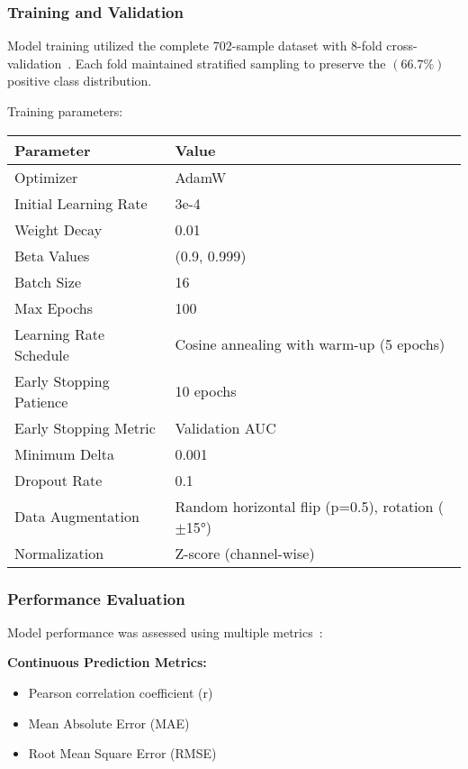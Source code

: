 \subsubsection{Training and Validation}

Model training utilized the complete 702-sample dataset with 8-fold cross-validation~\cite{varoquaux2022machine}. Each fold maintained stratified sampling to preserve the $(66.7\%)$ positive class distribution.

Training parameters:

\begin{center}
\small
\begin{tabular}{ll}
\hline
\textbf{Parameter} & \textbf{Value} \\
\hline
Optimizer & AdamW \\
Initial Learning Rate & 3e-4 \\
Weight Decay & 0.01 \\
Beta Values & (0.9, 0.999) \\
Batch Size & 16 \\
Max Epochs & 100 \\
Learning Rate Schedule & Cosine annealing with warm-up (5 epochs) \\
Early Stopping Patience & 10 epochs \\
Early Stopping Metric & Validation AUC \\
Minimum Delta & 0.001 \\
Dropout Rate & 0.1 \\
Data Augmentation & Random horizontal flip (p=0.5), rotation ($\pm$15°) \\
Normalization & Z-score (channel-wise) \\
\hline
\end{tabular}
\end{center}

\subsubsection{Performance Evaluation}

Model performance was assessed using multiple metrics~\cite{litjens2017survey}:

\textbf{Continuous Prediction Metrics:}
\begin{itemize}
\item Pearson correlation coefficient (r)
\item Mean Absolute Error (MAE) 
\item Root Mean Square Error (RMSE)
\end{itemize}

